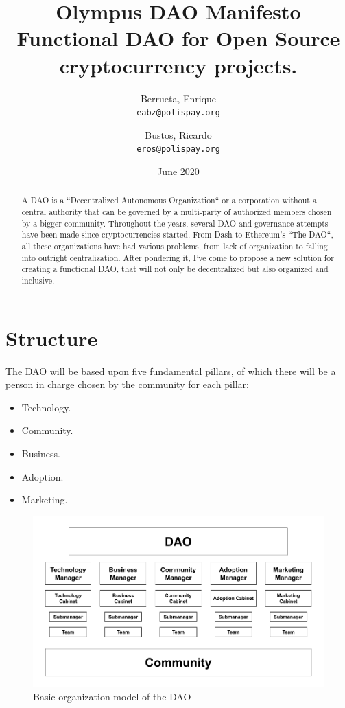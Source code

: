 \documentclass{article}
\title{%
  Olympus DAO Manifesto \\
  \large Functional DAO for Open Source cryptocurrency projects.}
\author{
  Berrueta, Enrique\\
  \texttt{eabz@polispay.org}
  \and
  Bustos, Ricardo\\
  \texttt{eros@polispay.org}
}
\date{June 2020}
\begin{document}
\maketitle

	\begin{abstract}
    A DAO is a ``Decentralized Autonomous Organization`` or a corporation without a central authority that can be governed by a multi-party of authorized members chosen by a bigger community. Throughout the years, several DAO and governance attempts have been made since cryptocurrencies started. From Dash to Ethereum's ``The DAO``, all these organizations have had various problems, from lack of organization to falling into outright centralization. After pondering it, I've come to propose a new solution for creating a functional DAO, that will not only be decentralized but also organized and inclusive.
	\end{abstract}

\newpage

\tableofcontents


\newpage

\section{Structure}

The DAO will be based upon five fundamental pillars, of which there will be a person in charge chosen by the community for each pillar:

\begin{itemize}
  \item Technology.
  \item Community.
  \item Business.
  \item Adoption.
  \item Marketing.
\end{itemize}

\begin{figure}[h]
\includegraphics[scale=0.4]{img/dao_structure_en.png}
\centering
\caption{Basic organization model of the DAO}
\end{figure}
\end{document}
